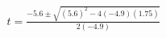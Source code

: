 \documentclass[preview]{standalone}
\begin{document}
\begin{align*}
t = \frac{ -5.6 \pm \sqrt{(5.6)^2 - 4(-4.9)(1.75)} }{ 2(-4.9) }
\end{align*}
\end{document}

